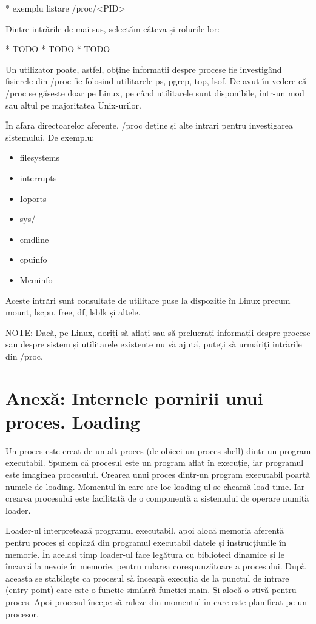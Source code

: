 * exemplu listare /proc/<PID>

Dintre intrările de mai sus, selectăm câteva și rolurile lor:

* TODO
* TODO
* TODO

Un utilizator poate, astfel, obține informații despre procese fie investigând
fișierele din /proc fie folosind utilitarele ps, pgrep, top, lsof. De avut în
vedere că /proc se găsește doar pe Linux, pe când utilitarele sunt disponibile,
într-un mod sau altul pe majoritatea Unix-urilor.

În afara directoarelor aferente, /proc deține și alte intrări pentru investigarea sistemului. De exemplu:

\begin{itemize}
	\item filesystems
	\item interrupts
	\item Ioports
	\item sys/
	\item cmdline
	\item cpuinfo
	\item Meminfo
\end{itemize}

Aceste intrări sunt consultate de utilitare puse la dispoziție în Linux precum
mount, lscpu, free, df, lsblk și altele.

NOTE: Dacă, pe Linux, doriți să aflați sau să prelucrați informații despre
procese sau despre sistem și utilitarele existente nu vă ajută, puteți să
urmăriți intrările din /proc.

\section{Anexă: Internele pornirii unui proces. Loading}
\label{sec:procese-loading}

Un proces este creat de un alt proces (de obicei un proces shell) dintr-un
program executabil. Spunem că procesul este un program aflat în execuție, iar
programul este imaginea procesului. Crearea unui proces dintr-un program
executabil poartă numele de loading. Momentul în care are loc loading-ul se
cheamă load time. Iar crearea procesului este facilitată de o componentă a
sistemului de operare numită loader.

Loader-ul interpretează programul executabil, apoi alocă memoria aferentă pentru
proces și copiază din programul executabil datele și instrucțiunile în memorie.
În același timp loader-ul face legătura cu biblioteci dinamice și le încarcă la
nevoie în memorie, pentru rularea corespunzătoare a procesului. După aceasta se
stabilește ca procesul să înceapă execuția de la punctul de intrare (entry
point) care este o funcție similară funcției main. Și alocă o stivă pentru
proces. Apoi procesul începe să ruleze din momentul în care este planificat pe
un procesor.

